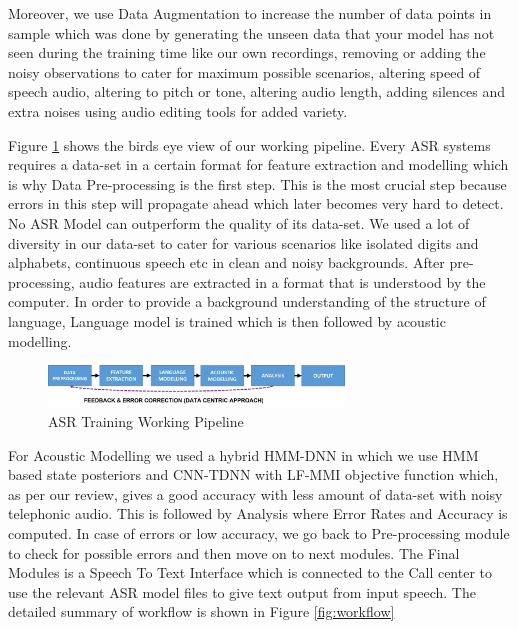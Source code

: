 \documentclass[lettersize,journal]{IEEEtran}
\begin{document}
Moreover, we use Data Augmentation to increase the number of data points in sample which was done by generating the unseen data that your model has not seen during the training time like our own recordings, removing or adding the noisy observations to cater for maximum possible scenarios, altering speed of speech audio, altering to pitch or tone, altering audio length, adding silences and extra noises using audio editing tools \cite{audacity_linux_nodate} for added variety.

Figure \ref{fig:working_pipeline_short} shows the birds eye view of our working pipeline. Every ASR systems requires a data-set in a certain format for feature extraction and modelling which is why Data Pre-processing is the first step. This is the most crucial step because errors in this step will propagate ahead which later becomes very hard to detect. No ASR Model can outperform the quality of its data-set. We used a lot of diversity in our data-set to cater for various scenarios like isolated digits and alphabets, continuous speech etc in clean and noisy backgrounds. After pre-processing, audio features are extracted in a format that is understood by the computer. In order to provide a background understanding of the structure of language, Language model is trained which is then followed by acoustic modelling. 

\begin{figure}[h]
    \centering
    \includegraphics[width=0.7\textwidth]{img/working-pipeline-short.png}
    \caption{ASR Training Working Pipeline}
    \label{fig:working_pipeline_short}
\end{figure}


For Acoustic Modelling we used a hybrid HMM-DNN in which we use HMM based state posteriors and CNN-TDNN with LF-MMI objective function which, as per our review, gives a good accuracy with less amount of data-set with noisy telephonic audio. This is followed by Analysis where Error Rates and Accuracy is computed. In case of errors or low accuracy, we go back to Pre-processing module to check for possible errors and then move on to next modules. The Final Modules is a Speech To Text Interface which is connected to the Call center to use the relevant ASR model files to give text output from input speech. The detailed summary of workflow is shown in Figure 
\ref{fig:workflow}
\end{document}
